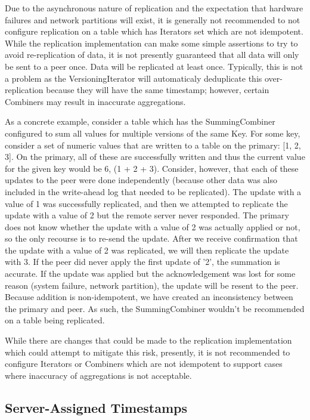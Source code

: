 Due to the asynchronous nature of replication and the expectation that hardware failures and network partitions will exist,
it is generally not recommended to not configure replication on a table which has Iterators set which are not idempotent.
While the replication implementation can make some simple assertions to try to avoid re-replication of data, it is not
presently guaranteed that all data will only be sent to a peer once. Data will be replicated at least once. Typically,
this is not a problem as the VersioningIterator will automaticaly deduplicate this over-replication because they will
have the same timestamp; however, certain Combiners may result in inaccurate aggregations.

As a concrete example, consider a table which has the SummingCombiner configured to sum all values for
multiple versions of the same Key. For some key, consider a set of numeric values that are written to a table on the
primary: [1, 2, 3]. On the primary, all of these are successfully written and thus the current value for the given key
would be 6, (1 + 2 + 3). Consider, however, that each of these updates to the peer were done independently (because
other data was also included in the write-ahead log that needed to be replicated). The update with a value of 1 was
successfully replicated, and then we attempted to replicate the update with a value of 2 but the remote server never
responded. The primary does not know whether the update with a value of 2 was actually applied or not, so the
only recourse is to re-send the update. After we receive confirmation that the update with a value of 2 was replicated,
we will then replicate the update with 3. If the peer did never apply the first update of '2', the summation is accurate.
If the update was applied but the acknowledgement was lost for some reason (system failure, network partition), the
update will be resent to the peer. Because addition is non-idempotent, we have created an inconsistency between the
primary and peer. As such, the SummingCombiner wouldn't be recommended on a table being replicated.

While there are changes that could be made to the replication implementation which could attempt to mitigate this risk,
presently, it is not recommended to configure Iterators or Combiners which are not idempotent to support cases where
inaccuracy of aggregations is not acceptable.

\subsection{Server-Assigned Timestamps}

